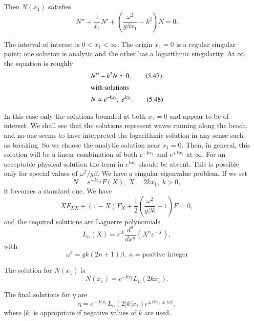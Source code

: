 Then $N(x_1)$ satisfies
\begin{equation}
N''+\frac{1}{x_1}N'+\left(\frac{\omega^2}{g\beta x_1}-k^2\right)N=0. \tag{5.46}\label{chap5:eq5.46}
\end{equation}

The interval of interest is $0<x_1<\infty$. The origin $x_1=0$ is a regular singular point; one solution is analytic and the other has a logarithmic singularity. At $\infty$, the equation is roughly 
\begin{align}
&N''-k^2N\simeq 0,\tag{5.47}\label{chap5:eq5.47}\\
\intertext{with solutions}
&N\simeq e^{-kx_1},\;e^{kx_1}.\tag{5.48}\label{chap5:eq5.48}
\end{align}

In this case only the solutions bounded at both $x_1=0$ and appear to be of interest. We shall see that the solutions represent waves running along the beach, and no-one seems to have interpreted the logarithmic solution in any sense such as breaking. So we choose the analytic solution near $x_1=0$. Then, in general, this solution will be a linear combination of both $e^{-kx_1}$ and $e^{+kx_1}$ at $\infty$. For an acceptable physical solution the term in $e^{kx_1}$ should be absent. This is possible only for special values of $\omega^2/g\beta$. We have a singular eigenvalue problem. If we set 
\begin{equation}
N=e^{-kx_1} F(X),\;X=2kx_1,\;k>0,\tag{5.49}\label{chap5:eq5.49}
\end{equation}
it becomes a standard one. We have 
\begin{equation}
XF_{XX}+(1-X)F_X+\frac{1}{2}\left(\frac{\omega^2}{g\beta k}-1\right)F=0, \tag{5.50}\label{chap5:eq5.50}
\end{equation}
and the required solutions are Laguerre polynomials
$$
L_n(X)=e^X\frac{d^n}{dx^n}\left(X^ne^{-X}\right),
$$\pageoriginale
with
\begin{equation}
\omega^2=gk(2n+1)\beta, \;n=\text{positive integer} \tag{5.51}\label{chap5:eq5.51}
\end{equation}

The solution for $N(x_1)$ is 
\begin{equation}
N(x_1)=e^{-kx_1}L_n(2kx_1).\tag{5.52}\label{chap5:eq5.52}
\end{equation}

The final solutions for $\eta$ are 
\begin{equation}
\eta=e^{-|k|x_1}L_n\left(2|k|x_1\right)e^{\pm ikx_2\pm i\omega t}, \tag{5.53}\label{chap5:eq5.53}
\end{equation}
where $|k|$ is appropriate if negative values of $k$ are used. 

